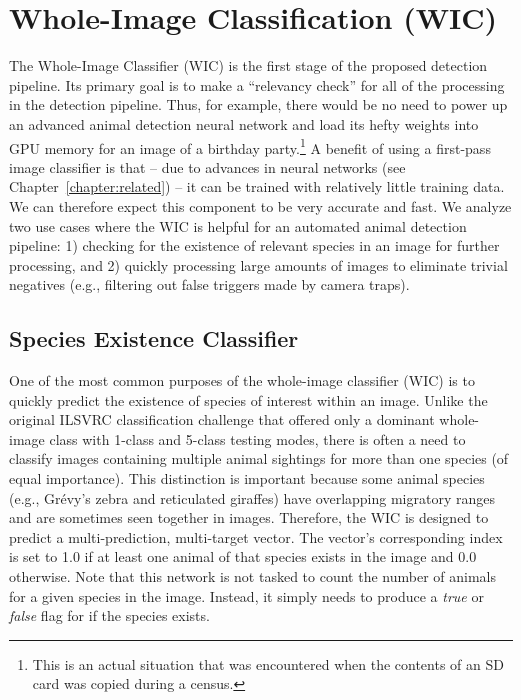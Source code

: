 \section{Whole-Image Classification (WIC)}\label{sec:wic}

The Whole-Image Classifier (WIC) is the first stage of the proposed detection pipeline.  Its primary goal is to make a ``relevancy check'' for all of the processing in the detection pipeline. Thus, for example, there would be no need to power up an advanced animal detection neural network and load its hefty weights into GPU memory for an image of a birthday party.\footnote{This is an actual situation that was encountered when the contents of an SD card was copied during a census.}  A benefit of using a first-pass image classifier is that -- due to advances in neural networks (see Chapter~\ref{chapter:related}) -- it can be trained with relatively little training data.  We can therefore expect this component to be very accurate and fast.  We analyze two use cases where the WIC is helpful for an automated animal detection pipeline: 1) checking for the existence of relevant species in an image for further processing, and 2) quickly processing large amounts of images to eliminate trivial negatives (e.g., filtering out false triggers made by camera traps).

\subsection{Species Existence Classifier}

One of the most common purposes of the whole-image classifier (WIC) is to quickly predict the existence of species of interest within an image.  Unlike the original ILSVRC classification challenge that offered only a dominant whole-image class with 1-class and 5-class testing modes, there is often a need to classify images containing multiple animal sightings for more than one species (of equal importance).  This distinction is important because some animal species (e.g., Gr\'evy's zebra and reticulated giraffes) have overlapping migratory ranges and are sometimes seen together in images.  Therefore, the WIC is designed to predict a multi-prediction, multi-target vector.  The vector's corresponding index is set to 1.0 if at least one animal of that species exists in the image and 0.0 otherwise.  Note that this network is not tasked to count the number of animals for a given species in the image.  Instead, it simply needs to produce a \textit{true} or \textit{false} flag for if the species exists.

